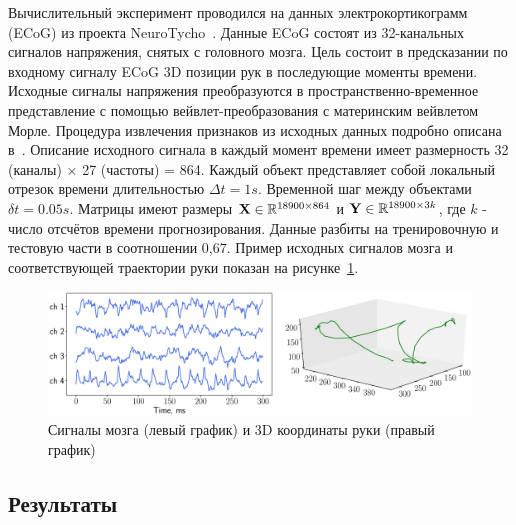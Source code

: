 Вычислительный эксперимент проводился на данных электрокортикограмм (ECoG) из проекта NeuroTycho~\cite{shimoda2012decoding}.
Данные ECoG состоят из 32-канальных сигналов напряжения, снятых с головного мозга.
Цель состоит в предсказании по входному сигналу ECoG 3D позиции рук в последующие моменты времени.
Исходные сигналы напряжения преобразуются в пространственно-временное представление с помощью вейвлет-преобразования с материнским вейвлетом Морле.
Процедура извлечения признаков из исходных данных подробно описана в~\cite{chao2010long,eliseyev2016penalized}.
Описание исходного сигнала в каждый момент времени имеет размерность 32 (каналы) $\times $ 27 (частоты) = 864.
Каждый объект представляет собой локальный отрезок времени длительностью $\Delta t = 1s$. Временной шаг между объектами $\delta t = 0.05 s$.
Матрицы имеют размеры $\mathbf{X} \in \mathbb{R}^{18900 \times 864}$ и $\mathbf{Y} \in \mathbb{R}^{18900 \times 3k}$, где $k$ - число отсчётов времени прогнозирования.
Данные разбиты на тренировочную и тестовую части в соотношении 0,67. 
Пример исходных сигналов мозга и соответствующей траектории руки показан на рисунке~\ref{fig:ecog_data}.

\begin{figure}
	\centering
	\includegraphics[width=\linewidth]{figs/ch2/ecog_data}
	\caption{Сигналы мозга (левый график) и 3D координаты руки (правый график)}
	\label{fig:ecog_data}
\end{figure}

\subsection{Результаты}

